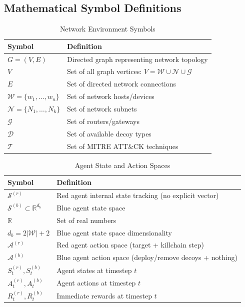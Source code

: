 \documentclass[12pt,oneside]{article}
\begin{document}
\subsection{Mathematical Symbol Definitions}

\begin{table}[H]
\centering
\caption{Network Environment Symbols}
\label{tab:network_symbols}
\small
\begin{tabular}{|l|p{7cm}|}
\hline
\rowcolor{cwBorder!30} \textbf{Symbol} & \textbf{Definition} \\
\hline
$G = (V, E)$ & Directed graph representing network topology \\
$V$ & Set of all graph vertices: $V = \mathcal{W} \cup \mathcal{N} \cup \mathcal{G}$ \\
$E$ & Set of directed network connections \\
$\mathcal{W} = \{w_1, \ldots, w_n\}$ & Set of network hosts/devices \\
$\mathcal{N} = \{N_1, \ldots, N_k\}$ & Set of network subnets \\
$\mathcal{G}$ & Set of routers/gateways \\
$\mathcal{D}$ & Set of available decoy types \\
$\mathcal{T}$ & Set of MITRE ATT\&CK techniques \\
\hline
\end{tabular}
\end{table}

\begin{table}[H]
\centering
\caption{Agent State and Action Spaces}
\label{tab:agent_symbols}
\small
\begin{tabular}{|l|p{7cm}|}
\hline
\rowcolor{cwBorder!30} \textbf{Symbol} & \textbf{Definition} \\
\hline
$\mathcal{S}^{(r)}$ & Red agent internal state tracking (no explicit vector) \\
$\mathcal{S}^{(b)} \subset \mathbb{R}^{d_b}$ & Blue agent state space \\
$\mathbb{R}$ & Set of real numbers \\
$d_b = 2|\mathcal{W}| + 2$ & Blue agent state space dimensionality \\
$\mathcal{A}^{(r)}$ & Red agent action space (target + killchain step) \\
$\mathcal{A}^{(b)}$ & Blue agent action space (deploy/remove decoys + nothing) \\
$S_t^{(r)}, S_t^{(b)}$ & Agent states at timestep $t$ \\
$A_t^{(r)}, A_t^{(b)}$ & Agent actions at timestep $t$ \\
$R_t^{(r)}, R_t^{(b)}$ & Immediate rewards at timestep $t$ \\
\hline
\end{tabular}
\end{table}
\end{document}
